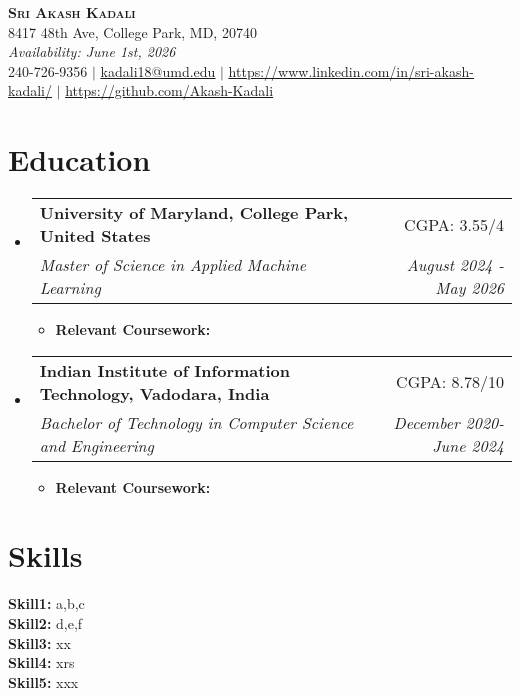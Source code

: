 \documentclass[letterpaper,10pt]{article}
\makeatletter
\newcommand{\resumeSubheading}[4]{
  \vspace{-2pt}\item
    \begin{tabular*}{0.97\textwidth}[t]{l@{\extracolsep{\fill}}r}
      \textbf{#1} & #2 \\
      \textit{\small#3} & \textit{\small #4} \\
    \end{tabular*}\vspace{-7pt}
}
\newcommand{\resumeSubHeadingListStart}{\begin{itemize}[leftmargin=0.15in, label={}]}
\newcommand{\resumeSubHeadingListEnd}{\end{itemize}}
\newcommand{\resumeItemListStart}{\begin{itemize}}
\newcommand{\resumeItemListEnd}{\end{itemize}\vspace{-5pt}}
\makeatother
\begin{document}
\begin{center}
    \textbf{\Huge \scshape Sri Akash Kadali} \\ \vspace{1pt}
    8417 48th Ave, College Park, MD, 20740 \\ \vspace{1pt}
     \textit{Availability: June 1st, 2026} \\ \vspace{1pt}
    \small 240-726-9356 $|$ \href{mailto:kadali18@umd.edu}{\underline{kadali18@umd.edu}} $|$ 
    \href{https://www.linkedin.com/in/sri-akash-kadali/}{\underline{https://www.linkedin.com/in/sri-akash-kadali/}} $|$
    \href{https://github.com/Akash-Kadali}{\underline{https://github.com/Akash-Kadali}}
\end{center}

\section{Education}
\resumeSubHeadingListStart
   \resumeSubheading
      {University of Maryland, College Park, United States \scriptsize{} }{CGPA: 3.55/4}
      {Master of Science in Applied Machine Learning}{August 2024 - May 2026}
      \resumeItemListStart
      \item \textbf{Relevant Coursework:}
      \resumeItemListEnd

      \resumeSubheading
      {Indian Institute of Information Technology, Vadodara, India \scriptsize{} }{CGPA: 8.78/10}
      {Bachelor of Technology in Computer Science and Engineering}{December 2020- June 2024}
      \resumeItemListStart
      \item \textbf{Relevant Coursework:}
\resumeItemListEnd
  \resumeSubHeadingListEnd

\section{Skills}
 \begin{itemize}[leftmargin=0.15in, label={}]
    \small{\item{
\textbf{Skill1:} a,b,c\\
\textbf{Skill2:}  d,e,f\\
\textbf{Skill3:} xx\\
\textbf{Skill4:}  xrs\\
\textbf{Skill5:} xxx\\
    }}
 \end{itemize}
\end{document}
